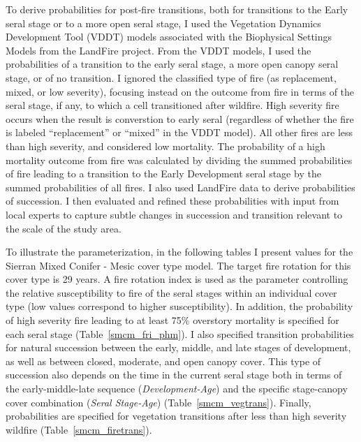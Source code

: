 To derive probabilities for post-fire transitions, both for transitions to the Early seral stage or to a more open seral stage, I used the Vegetation Dynamics Development Tool (VDDT) models associated with the Biophysical Settings Models from the LandFire project. From the VDDT models, I used the probabilities of a transition to the early seral stage, a more open canopy seral stage, or of no transition. I ignored the classified type of fire (as replacement, mixed, or low severity), focusing instead on the outcome from fire in terms of the seral stage, if any, to which a cell transitioned after wildfire. High severity fire occurs when the result is converstion to early seral (regardless of whether the fire is labeled ``replacement'' or ``mixed'' in the VDDT model). All other fires are less than high severity, and considered low mortality. The probability of a high mortality outcome from fire was calculated by dividing the summed probabilities of fire leading to a transition to the Early Development seral stage by the summed probabilities of all fires.  I also used LandFire data to derive probabilities of succession. I then evaluated and refined these probabilities with input from local experts to capture subtle changes in succession and transition relevant to the scale of the study area.

To illustrate the parameterization, in the following tables I present values for the Sierran Mixed Conifer - Mesic cover type model. The target fire rotation for this cover type is 29 years. A fire rotation index is used as the parameter controlling the relative susceptibility to fire of the seral stages within an individual cover type (low values correspond to higher susceptibility). In addition, the probability of high severity fire leading to at least 75\% overstory mortality is specified for each seral stage (Table~\ref{smcm_fri_phm}). I also specified transition probabilities for natural succession between the early, middle, and late stages of development, as well as between closed, moderate, and open canopy cover. This type of succession also depends on the time in the current seral stage both in terms of the early-middle-late sequence (\emph{Development-Age}) and the specific stage-canopy cover combination (\emph{Seral Stage-Age}) (Table~\ref{smcm_vegtrans}). Finally, probabilities are specified for vegetation transitions after less than high severity wildfire (Table~\ref{smcm_firetrans}).


